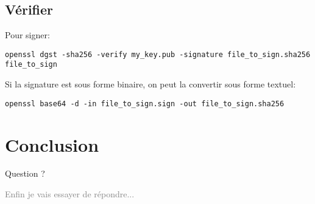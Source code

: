 \documentclass[compress,aspectratio=169]{beamer}
\begin{document}
\subsection{Vérifier}
\begin{frame}[fragile]
Pour signer:
\begin{lstlisting}[style=shell]
openssl dgst -sha256 -verify my_key.pub -signature file_to_sign.sha256 file_to_sign
\end{lstlisting}
Si la signature est sous forme binaire, on peut la convertir sous forme textuel:
\begin{lstlisting}[style=shell]
openssl base64 -d -in file_to_sign.sign -out file_to_sign.sha256
\end{lstlisting}
\end{frame}


\section*{Conclusion}
\begin{frame}
\begin{center}
\begin{huge}
Question ?
\end{huge}
\end{center}
\begin{center}
\textcolor{gray}{\tiny{Enfin je vais essayer de répondre...}}
\end{center}
\end{frame}
\end{document}

